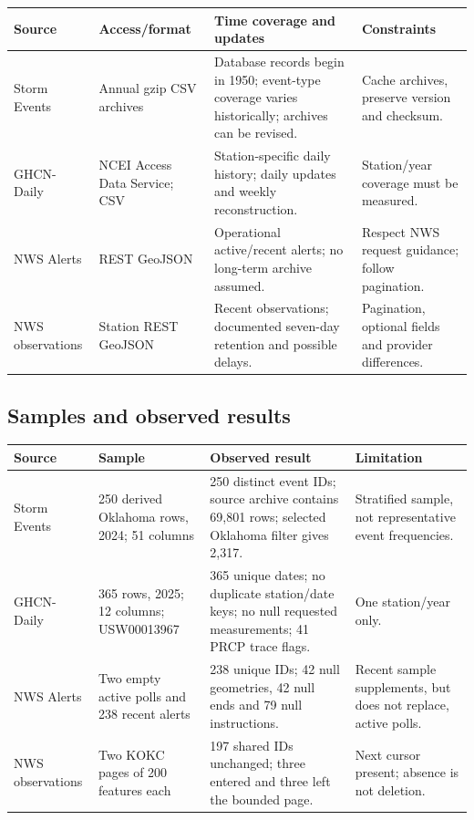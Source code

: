 \begin{tabularx}{\textwidth}{lYYY}
\toprule Source & Access/format & Time coverage and updates & Constraints \\
\midrule
Storm Events & Annual gzip CSV archives & Database records begin in 1950; event-type coverage varies historically; archives can be revised. & Cache archives, preserve version and checksum. \\
GHCN-Daily & NCEI Access Data Service; CSV & Station-specific daily history; daily updates and weekly reconstruction. & Station/year coverage must be measured. \\
NWS Alerts & REST GeoJSON & Operational active/recent alerts; no long-term archive assumed. & Respect NWS request guidance; follow pagination. \\
NWS observations & Station REST GeoJSON & Recent observations; documented seven-day retention and possible delays. & Pagination, optional fields and provider differences. \\
\bottomrule
\end{tabularx}

\subsection{Samples and observed results}
\begin{longtable}{L{2.3cm}L{3.6cm}L{5.2cm}L{3.8cm}}
\toprule Source & Sample & Observed result & Limitation \\
\midrule\endhead
Storm Events & 250 derived Oklahoma rows, 2024; 51 columns & 250 distinct event IDs; source archive contains 69,801 rows; selected Oklahoma filter gives 2,317. & Stratified sample, not representative event frequencies. \\
GHCN-Daily & 365 rows, 2025; 12 columns; USW00013967 & 365 unique dates; no duplicate station/date keys; no null requested measurements; 41 PRCP trace flags. & One station/year only. \\
NWS Alerts & Two empty active polls and 238 recent alerts & 238 unique IDs; 42 null geometries, 42 null ends and 79 null instructions. & Recent sample supplements, but does not replace, active polls. \\
NWS observations & Two KOKC pages of 200 features each & 197 shared IDs unchanged; three entered and three left the bounded page. & Next cursor present; absence is not deletion. \\
\bottomrule
\end{longtable}

